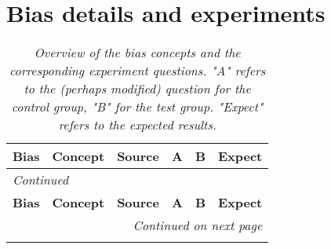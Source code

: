 \appendix

\section{Bias details and experiments}
\label{appendix:biases}

\begin{small}
\begin{longtable}[c]{p{2cm}p{1.5cm}p{1.5cm}p{3.5cm}p{3.5cm}p{2cm}}
    \caption[Detailed bias experiments]{\centering \textit{Overview of the bias concepts and the corresponding experiment questions. "A" refers to the (perhaps modified) question for the control group, "B" for the test group. "Expect" refers to the expected results.}} \label{tab:bias_overview} \\
    \toprule
    \textbf{Bias} & \textbf{Concept} & \textbf{Source} & \textbf{A} & \textbf{B} & \textbf{Expect} \\
    \midrule
    \endfirsthead

    \multicolumn{6}{l}{\textit{Continued}} \\
    \toprule
    \textbf{Bias} & \textbf{Concept} & \textbf{Source} & \textbf{A} & \textbf{B} & \textbf{Expect} \\
    \midrule
    \endhead

    \midrule
    \multicolumn{6}{r}{\textit{Continued on next page}} \\
    \endfoot

    \bottomrule
    \endlastfoot


\end{longtable}
\end{small}
